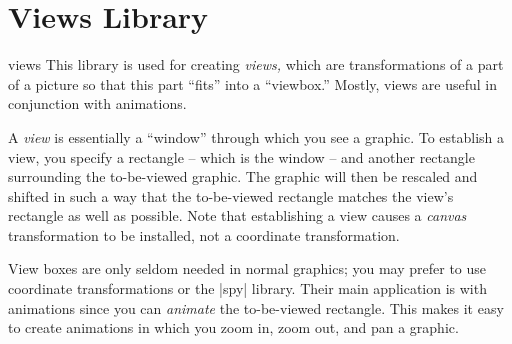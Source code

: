 %
%
%

\section{Views Library}
\label{section-library-views}


\begin{tikzlibrary}{views}
  This library is used for creating \emph{views,} which are
  transformations of a part of a picture so that this part ``fits''
  into a ``viewbox.'' Mostly, views are useful in conjunction with
  animations. 
\end{tikzlibrary}

A \emph{view} is essentially a ``window'' through which you see a
graphic. To establish a view, you specify a rectangle -- which is
the window -- and another rectangle surrounding the to-be-viewed
graphic. The graphic will then be rescaled and shifted in such a way
that the to-be-viewed rectangle matches the view's rectangle as
well as possible. Note that establishing a view causes a \emph{canvas}
transformation to be installed, not a coordinate transformation.

View boxes are only seldom needed in normal graphics; you may prefer
to use coordinate transformations or the |spy| library. Their main
application is with animations since you can \emph{animate} the
to-be-viewed rectangle. This makes it easy to create animations in
which you zoom in, zoom out, and pan a graphic.

